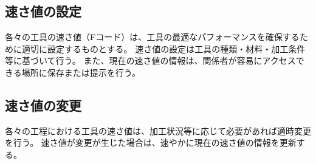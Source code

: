 \subsection{速さ値の設定}
各々の工具の速さ値（Fコード）は、工具の最適なパフォーマンスを確保するために適切に設定するものとする。
速さ値の設定は工具の種類・材料・加工条件等に基づいて行う。
また、現在の速さ値の情報は、関係者が容易にアクセスできる場所に保存または提示を行う。

\subsection{速さ値の変更}
各々の工程における工具の速さ値は、加工状況等に応じて必要があれば適時変更を行う。
速さ値が変更が生じた場合は、速やかに現在の速さ値の情報を更新する。
